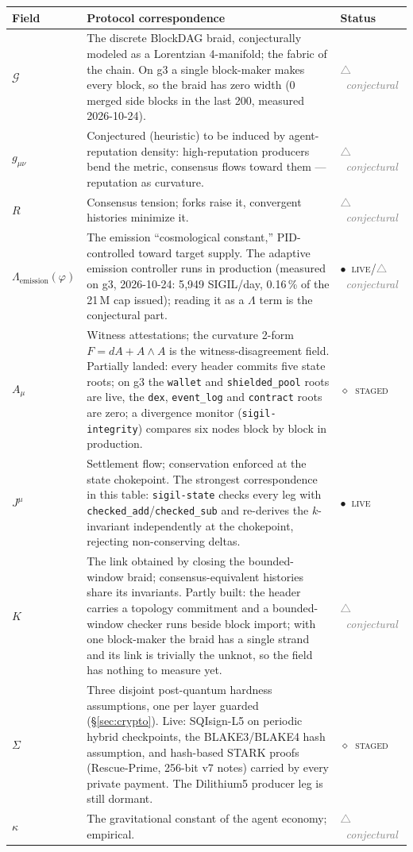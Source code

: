 \documentclass[10pt,a4paper]{article}
\newcommand{\stG}{\textcolor{sigilviolet}{$\diamond$}~{\scriptsize\textcolor{sigilviolet}{\textsc{staged}}}}
\newcommand{\stC}{{\scriptsize\textcolor{gray}{$\triangle$~\textit{conjectural}}}}
\newcommand{\stL}{\textcolor{sigilcyan}{$\bullet$}~{\scriptsize\textcolor{sigilcyan}{\textsc{live}}}}
\begin{document}
\begin{center}
\small
{}
\renewcommand{\arraystretch}{1.45}
\begin{tabularx}{\textwidth}{@{}l>{\RaggedRight\arraybackslash}X l@{}}
\toprule
Field & Protocol correspondence & Status \\
\midrule
$\mathcal{G}$ & The discrete BlockDAG braid, conjecturally modeled as a Lorentzian
4-manifold; the fabric of the chain. On g3 a single block-maker makes every block, so the braid has zero
width (0 merged side blocks in the last 200, measured 2026-10-24). & \stC \\
$g_{\mu\nu}$ & Conjectured (heuristic) to be induced by agent-reputation density:
high-reputation producers bend the metric, consensus flows toward them — reputation as
curvature. & \stC \\
$R$ & Consensus tension; forks raise it, convergent histories minimize it. & \stC \\
$\Lambda_{\mathrm{emission}}(\varphi)$ & The emission ``cosmological constant,''
PID-controlled toward target supply. The adaptive emission controller runs in
production (measured on g3, 2026-10-24: 5{,}949 SIGIL/day, 0.16\,\% of the 21\,M cap issued); reading it as
a $\Lambda$ term is the conjectural part. & \stL/\stC \\
$A_\mu$ & Witness attestations; the curvature 2-form $F = dA + A\wedge A$ is the
witness-disagreement field. Partially landed: every header commits five state roots; on g3 the
\texttt{wallet} and \texttt{shielded\_pool} roots are live, the \texttt{dex}, \texttt{event\_log} and
\texttt{contract} roots are zero; a divergence monitor (\texttt{sigil-integrity}) compares six nodes block by block
in production. & \stG \\
$J^\mu$ & Settlement flow; conservation enforced at the state chokepoint. The
strongest correspondence in this table: \texttt{sigil-state} checks every leg with
\texttt{checked\_add}/\texttt{checked\_sub} and re-derives the $k$-invariant
independently at the chokepoint, rejecting non-conserving deltas. & \stL \\
$K$ & The link obtained by closing the bounded-window braid; consensus-equivalent
histories share its invariants. Partly built: the header carries a topology commitment and a
bounded-window checker runs beside block import; with one block-maker the braid has a single strand and its link is
trivially the unknot, so the field has nothing to measure yet. & \stC \\
$\Sigma$ & Three disjoint post-quantum hardness assumptions, one per layer guarded
(\S\ref{sec:crypto}). Live: SQIsign-L5 on periodic hybrid checkpoints, the BLAKE3/BLAKE4 hash assumption,
and hash-based STARK proofs (Rescue-Prime, 256-bit v7 notes) carried by every private payment. The Dilithium5
producer leg is still dormant. & \stG \\
$\kappa$ & The gravitational constant of the agent economy; empirical. & \stC \\
\bottomrule
\end{tabularx}
\end{center}
\end{document}
